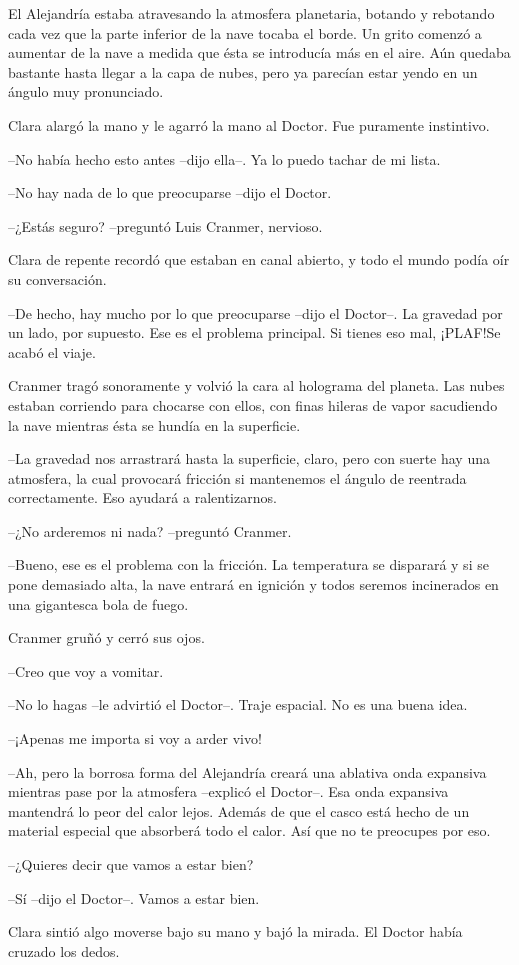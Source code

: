 {El Alejandría estaba atravesando la atmosfera planetaria, botando y
 rebotando cada vez que la parte inferior de la nave tocaba el borde. Un
 grito comenzó a aumentar de la nave a medida que ésta se introducía más
 en el aire. Aún quedaba bastante hasta llegar a la capa de nubes, pero
ya parecían estar yendo en un ángulo muy pronunciado.}

{Clara alargó la mano y le agarró la mano al Doctor. Fue puramente
instintivo.}

{--No había hecho esto antes --dijo ella--. Ya lo puedo tachar de mi
lista.}

{--No hay nada de lo que preocuparse --dijo el Doctor.}

{--¿Estás seguro? --preguntó Luis Cranmer, nervioso.}

{Clara de repente recordó que estaban en canal abierto, y todo el mundo
podía oír su conversación.}

{--De hecho, hay mucho por lo que preocuparse --dijo el Doctor--. La
 gravedad por un lado, por supuesto. Ese es el problema principal. Si
 tienes eso mal, ¡PLAF!\@ Se acabó el viaje.}

{Cranmer tragó sonoramente y volvió la cara al holograma del planeta. Las
 nubes estaban corriendo para chocarse con ellos, con finas hileras de
vapor sacudiendo la nave mientras ésta se hundía en la superficie.}

{--La gravedad nos arrastrará hasta la superficie, claro, pero con suerte
 hay una atmosfera, la cual provocará fricción si mantenemos el ángulo de
reentrada correctamente. Eso ayudará a ralentizarnos.}

{--¿No arderemos ni nada? --preguntó Cranmer.}

{--Bueno, ese es el problema con la fricción. La temperatura se disparará
 y si se pone demasiado alta, la nave entrará en ignición y todos seremos
incinerados en una gigantesca bola de fuego.}

{Cranmer gruñó y cerró sus ojos.}

{--Creo que voy a vomitar.}

{--No lo hagas --le advirtió el Doctor--. Traje espacial. No es una buena
idea.}

{--¡Apenas me importa si voy a arder vivo!}

{--Ah, pero la borrosa forma del Alejandría creará una ablativa onda
 expansiva mientras pase por la atmosfera --explicó el Doctor--. Esa onda
 expansiva mantendrá lo peor del calor lejos. Además de que el casco está
 hecho de un material especial que absorberá todo el calor. Así que no te
preocupes por eso.}

{--¿Quieres decir que vamos a estar bien?}

{--Sí --dijo el Doctor--. Vamos a estar bien.}

{Clara sintió algo moverse bajo su mano y bajó la mirada. El Doctor había
cruzado los dedos.}
